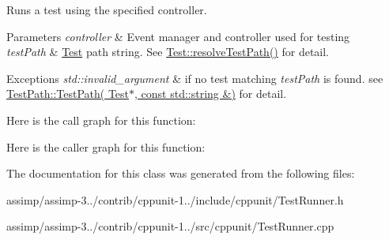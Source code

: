 Runs a test using the specified controller. 


\begin{DoxyParams}{Parameters}
{\em controller} & Event manager and controller used for testing \\
\hline
{\em test\+Path} & \hyperlink{class_test}{Test} path string. See \hyperlink{class_test_a90a4bd044778e025641857fa7ddf12ad}{Test\+::resolve\+Test\+Path()} for detail. \\
\hline
\end{DoxyParams}

\begin{DoxyExceptions}{Exceptions}
{\em std\+::invalid\+\_\+argument} & if no test matching {\itshape test\+Path} is found. see \hyperlink{class_test_path_a5855701e39a328a19f9780a130106cb3}{Test\+Path\+::\+Test\+Path( Test$\ast$, const std\+::string \&)} for detail. \\
\hline
\end{DoxyExceptions}


Here is the call graph for this function\+:




Here is the caller graph for this function\+:




The documentation for this class was generated from the following files\+:\begin{DoxyCompactItemize}
\item 
assimp/assimp-\/3../contrib/cppunit-\/1../include/cppunit/Test\+Runner.\+h\item 
assimp/assimp-\/3../contrib/cppunit-\/1../src/cppunit/Test\+Runner.\+cpp\end{DoxyCompactItemize}
